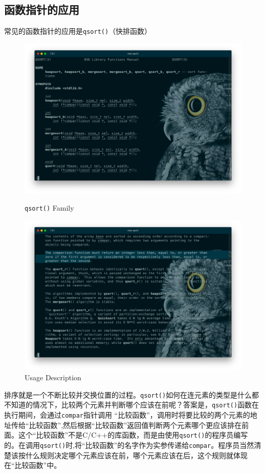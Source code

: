 \documentclass[]{report}
\begin{document}
		\subsection{函数指针的应用}
		常见的函数指针的应用是\verb|qsort()|（快排函数）
		\begin{figure}[h]
			\centering
			\begin{minipage}{18em}
				\centering
				\includegraphics[scale = 0.15]{images/qsort_family.png}
				\caption{\texttt{qsort()} Family}
			\end{minipage}
			\quad
			\begin{minipage}{18em}
				\centering
				\includegraphics[scale = 0.15]{images/qsort_discription.png}
				\caption{Usage Description}
			\end{minipage}
		\end{figure}
		排序就是一个不断比较并交换位置的过程。\verb|qsort()|如何在连元素的类型是什么都不知道的情况下，比较两个元素并判断哪个应该在前呢？答案是，\verb|qsort()|函数在执行期间，会通过\verb|compar|指针调用 “比较函数”，调用时将要比较的两个元素的地址传给“比较函数”,然后根据“比较函数”返回值判断两个元素哪个更应该排在前面。这个“比较函数”不是C/C++的库函数，而是由使用\verb|qsort()|的程序员编写的。在调用\verb|qsort()|时,将“比较函数”的名字作为实参传递给\verb|compar|。程序员当然清楚该按什么规则决定哪个元素应该在前，哪个元素应该在后，这个规则就体现在“比较函数”中。\par
\end{document}
